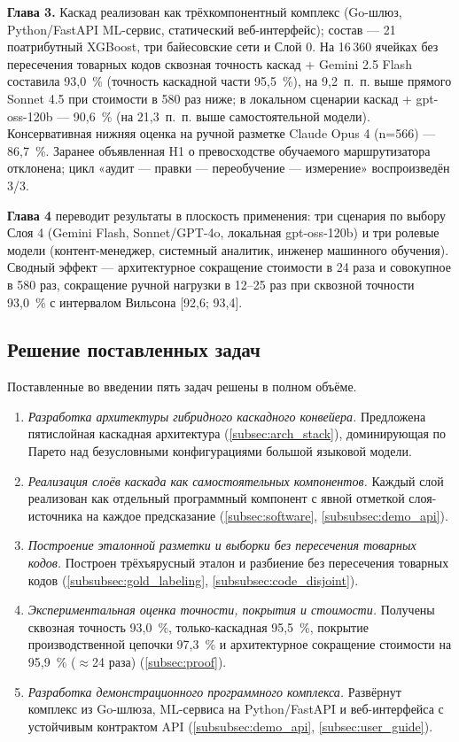 \textbf{Глава 3.} Каскад реализован как трёхкомпонентный комплекс (Go-шлюз, Python/FastAPI ML-сервис, статический веб-интерфейс); состав — 21 поатрибутный XGBoost, три байесовские сети и Слой 0. На 16\,360 ячейках без пересечения товарных кодов сквозная точность каскад + Gemini 2.5 Flash составила 93,0~\% (точность каскадной части 95,5~\%), на 9,2~п.~п. выше прямого Sonnet 4.5 при стоимости в 580 раз ниже; в локальном сценарии каскад + gpt-oss-120b — 90,6~\% (на 21,3~п.~п. выше самостоятельной модели). Консервативная нижняя оценка на ручной разметке Claude Opus 4 (n=566) — 86,7~\%. Заранее объявленная H1 о превосходстве обучаемого маршрутизатора отклонена; цикл «аудит — правки — переобучение — измерение» воспроизведён 3/3.

\textbf{Глава 4} переводит результаты в плоскость применения: три сценария по выбору Слоя 4 (Gemini Flash, Sonnet/GPT-4o, локальная gpt-oss-120b) и три ролевые модели (контент-менеджер, системный аналитик, инженер машинного обучения). Сводный эффект — архитектурное сокращение стоимости в 24 раза и совокупное в 580 раз, сокращение ручной нагрузки в 12--25 раз при сквозной точности 93,0~\% с интервалом Вильсона [92,6; 93,4].

\subsection*{Решение поставленных задач}

Поставленные во введении пять задач решены в полном объёме.

\begin{enumerate}[label=\arabic*)]
    \item \emph{Разработка архитектуры гибридного каскадного конвейера.} Предложена пятислойная каскадная архитектура (\ref{subsec:arch_stack}), доминирующая по Парето над безусловными конфигурациями большой языковой модели.
    \item \emph{Реализация слоёв каскада как самостоятельных компонентов.} Каждый слой реализован как отдельный программный компонент с явной отметкой слоя-источника на каждое предсказание (\ref{subsec:software}, \ref{subsubsec:demo_api}).
    \item \emph{Построение эталонной разметки и выборки без пересечения товарных кодов.} Построен трёхъярусный эталон и разбиение без пересечения товарных кодов (\ref{subsubsec:gold_labeling}, \ref{subsubsec:code_disjoint}).
    \item \emph{Экспериментальная оценка точности, покрытия и стоимости.} Получены сквозная точность 93,0~\%, только-каскадная 95,5~\%, покрытие производственной цепочки 97,3~\% и архитектурное сокращение стоимости на 95,9~\% ($\approx$24 раза) (\ref{subsec:proof}).
    \item \emph{Разработка демонстрационного программного комплекса.} Развёрнут комплекс из Go-шлюза, ML-сервиса на Python/FastAPI и веб-интерфейса с устойчивым контрактом API (\ref{subsubsec:demo_api}, \ref{subsec:user_guide}).
\end{enumerate}

